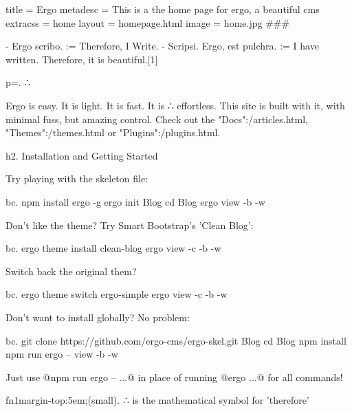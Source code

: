 title = Ergo
metadesc = This is a the home page for ergo, a beautiful cms
extracss = home
layout = homepage.html
image = home.jpg
###


- Ergo scribo. := Therefore, I Write.
- Scripsi. Ergo, est pulchra. :=  I have written. Therefore, it is beautiful.[1]


p=. ∴ 


Ergo is easy. It is light. It is fast. It is ∴ effortless. This site is built with it, with minimal fuss, but amazing control. Check out the "Docs":/articles.html, "Themes":/themes.html or "Plugins":/plugins.html.

h2. Installation and Getting Started

Try playing with the skeleton file:

bc. npm install ergo -g
ergo init Blog
cd Blog
ergo view -b -w

Don't like the theme? Try Smart Bootstrap's 'Clean Blog':

bc. ergo theme install clean-blog
ergo view -c -b -w

Switch back the original them? 

bc. ergo theme switch ergo-simple
ergo view -c -b -w

Don't want to install globally? No problem:

bc. git clone https://github.com/ergo-cms/ergo-skel.git Blog
cd Blog
npm install
npm run ergo -- view -b -w

Just use @npm run ergo --  ...@ in place of running @ergo ...@ for all commands!

fn1{margin-top:5em;}(small). ∴ is the mathematical symbol for 'therefore'
